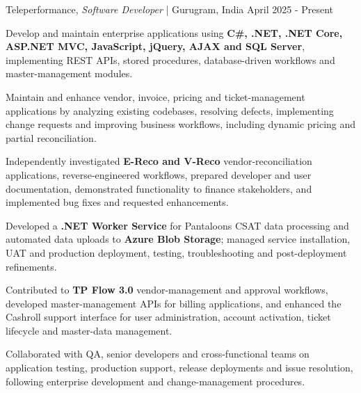 

\begin{cventries2}


  \cventrynew
    {Teleperformance, \textnormal{\textit{Software Developer} | Gurugram, India}} %
    {April 2025 - Present} %
    {
      \begin{cvitems} %
        \item {Develop and maintain enterprise applications using {\bf C\#, .NET, .NET Core, ASP.NET MVC, JavaScript, jQuery, AJAX and SQL Server}, implementing REST APIs, stored procedures, database-driven workflows and master-management modules.}
        \item {Maintain and enhance vendor, invoice, pricing and ticket-management applications by analyzing existing codebases, resolving defects, implementing change requests and improving business workflows, including dynamic pricing and partial reconciliation.}
        \item {Independently investigated {\bf E-Reco and V-Reco} vendor-reconciliation applications, reverse-engineered workflows, prepared developer and user documentation, demonstrated functionality to finance stakeholders, and implemented bug fixes and requested enhancements.}
        \item {Developed a {\bf .NET Worker Service} for Pantaloons CSAT data processing and automated data uploads to {\bf Azure Blob Storage}; managed service installation, UAT and production deployment, testing, troubleshooting and post-deployment refinements.}
        \item {Contributed to {\bf TP Flow 3.0} vendor-management and approval workflows, developed master-management APIs for billing applications, and enhanced the Cashroll support interface for user administration, account activation, ticket lifecycle and master-data management.}
        \item {Collaborated with QA, senior developers and cross-functional teams on application testing, production support, release deployments and issue resolution, following enterprise development and change-management procedures.}
      \end{cvitems}
    }

\end{cventries2}
